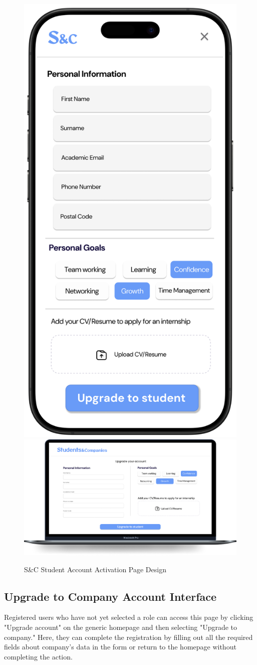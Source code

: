 \begin{figure}[H]
    \centering
    \includegraphics[width=0.2\linewidth]{Images/Mock-up/mobile upgrade to student.png}
    \includegraphics[width=0.75\linewidth]{Images/Mock-up/Upgrade to student.png}
    \caption{S\&C Student Account Activation Page Design}
    \label{fig:homepage-design}
\end{figure}

\subsection{Upgrade to Company Account Interface}

Registered users who have not yet selected a role can access this page by clicking "Upgrade account" on the generic homepage and then selecting "Upgrade to company." Here, they can complete the registration by filling out all the required fields about company's data in the form or return to the homepage without completing the action. \\

